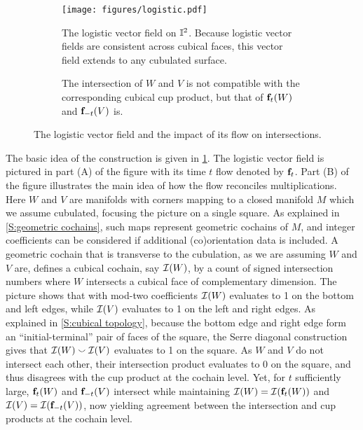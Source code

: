 \begin{figure}[h]
	\centering
	\hfill
	\begin{subfigure}[b]{0.45\textwidth}
		\hspace*{-9pt}
		\texttt{[image: figures/logistic.pdf]}
		\caption{The logistic vector field on $\mathbb{I}^2$.
		Because logistic vector fields are consistent across cubical faces, this vector field extends to any cubulated surface.}
	\end{subfigure}
	\hspace{0.2 in}
	\begin{subfigure}[b]{0.45\textwidth}
		\raisebox{9.5pt}{}
		\caption{The intersection of $W$ and $V$ is not compatible with the corresponding cubical cup product, but that of $\mathbf{f}_t(W)$ and $\mathbf{f}_{-t}(V)$ is.}
	\end{subfigure}
	\caption{The logistic vector field and the impact of its flow on intersections.}
	\label{F:logistic}
\end{figure}

The basic idea of the construction is given in \cref{F:logistic}.
The logistic vector field is pictured in part (A) of the figure with its time $t$ flow denoted by $\mathbf{f}_t$.
Part (B) of the figure illustrates the main idea of how the flow reconciles multiplications.
Here $W$ and $V$ are manifolds with corners mapping to a closed manifold $M$ which we assume cubulated, focusing the picture on a single square.
As explained in \cref{S:geometric cochains}, such maps represent geometric cochains of $M$, and integer coefficients can be considered if additional (co)orientation data is included.
A geometric cochain that is transverse to the cubulation, as we are assuming $W$ and $V$ are, defines a cubical cochain, say $\mathcal{I}(W)$, by a count of signed intersection numbers where $W$ intersects a cubical face of complementary dimension.
The picture shows that with mod-two coefficients $\mathcal{I}(W)$ evaluates to 1 on the bottom and left edges, while $\mathcal{I}(V)$ evaluates to 1 on the left and right edges.
As explained in \cref{S:cubical topology}, because the bottom edge and right edge form an ``initial-terminal'' pair of faces of the square, the Serre diagonal construction gives that $\mathcal{I}(W) \smallsmile \mathcal{I}(V)$ evaluates to 1 on the square.
As $W$ and $V$ do not intersect each other, their intersection product evaluates to 0 on the square, and thus disagrees with the cup product at the cochain level.
Yet, for $t$ sufficiently large, $\mathbf{f}_t(W)$ and $\mathbf{f}_{-t}(V)$ intersect while maintaining $\mathcal{I}(W) = \mathcal{I}(\mathbf{f}_t(W))$ and $\mathcal{I}(V) = \mathcal{I}(\mathbf{f}_{-t}(V))$, now yielding agreement between the intersection and cup products at the cochain level.

